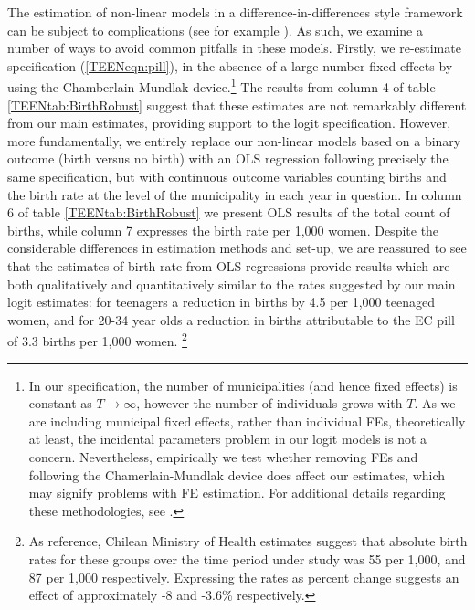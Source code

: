 The estimation of non-linear models in a difference-in-differences style 
framework can be subject to complications (see for example \citet{AiNorton2003}).
As such, we examine a number of ways to avoid common pitfalls in these models.
Firstly, we re-estimate specification (\ref{TEENeqn:pill}), in the absence of
a large number fixed effects by using the Chamberlain-Mundlak device.\footnote{%
In our specification, the number of municipalities (and hence fixed effects) is 
constant as $T\rightarrow\infty$, however the number of individuals grows with 
$T$.  As we are including municipal fixed effects, rather than individual FEs, 
theoretically at least, the incidental parameters problem in our logit models is 
not a concern.  Nevertheless, empirically we test whether removing FEs and 
following the Chamerlain-Mundlak device does affect our estimates, which may 
signify problems with FE estimation. For additional details regarding these 
methodologies, see \citet{Chamberlain1980,Wooldridge2005}.} The results from
column 4 of table \ref{TEENtab:BirthRobust} suggest that these estimates are not
remarkably different from our main estimates, providing support to the logit 
specification.  However, more fundamentally, we entirely replace our non-linear
models based on a binary outcome (birth versus no birth) with an OLS regression
following precisely the same specification, but with continuous outcome variables
counting births and the birth rate at the level of the municipality in each year
in question. In column 6 of table \ref{TEENtab:BirthRobust} we present OLS 
results of the total count of births, while column 7 expresses the birth rate 
per 1,000 women. Despite the considerable differences in estimation methods and 
set-up, we are reassured to see that the estimates of birth rate from OLS 
regressions provide results which are both qualitatively and quantitatively 
similar to the rates suggested by our main logit estimates: for teenagers a 
reduction in births by 4.5 per 1,000 teenaged women, and for 20-34 year olds a 
reduction in births attributable to the EC pill of 3.3 births per 1,000 women.%
\footnote{As reference, Chilean Ministry of Health estimates suggest that 
absolute birth rates for these groups over the time period under study was 55 per 
1,000, and 87 per 1,000 respectively.  Expressing the rates as percent change 
suggests an effect of approximately -8 and -3.6\% respectively.}

